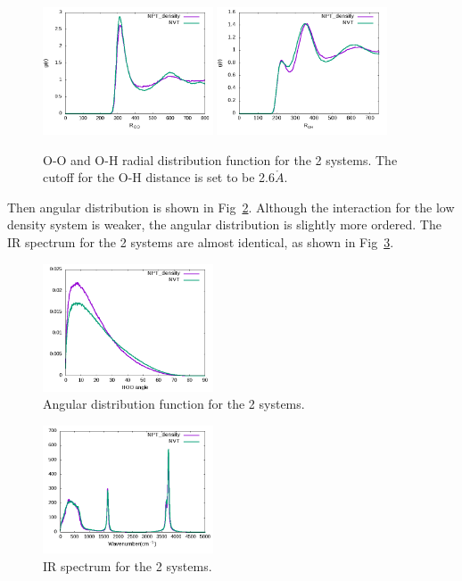\documentclass[prl,twocolumn,showpacs]{revtex4}
\begin{document}
\begin{figure}
\includegraphics[width=0.45\textwidth]{rdf_NVT_CPDNVT}
\includegraphics[width=0.45\textwidth]{rdf_OH_NVT_CPDNPT}
\caption{O-O and O-H radial distribution function for the 2 systems. The cutoff for the O-H distance is set to be 2.6$\mathring{A}$.}\label{Fig:rdf_cp}
\end{figure} 

Then angular distribution is shown in Fig~\ref{Fig:adfcp}. Although the interaction for the low density system is weaker, the angular distribution is slightly more ordered. The IR spectrum for the 2 systems are almost identical, as shown in Fig~\ref{Fig:ir_cp}.

\begin{figure}
\includegraphics[width=0.45\textwidth]{angular_NVT_NPTCP}
\caption{Angular distribution function for the 2 systems.}\label{Fig:adfcp}
\end{figure} 

\begin{figure}
\includegraphics[width=0.45\textwidth]{ir_NVT_NPTCP}
\caption{IR spectrum for the 2 systems.}\label{Fig:ir_cp}
\end{figure} 
\end{document}
